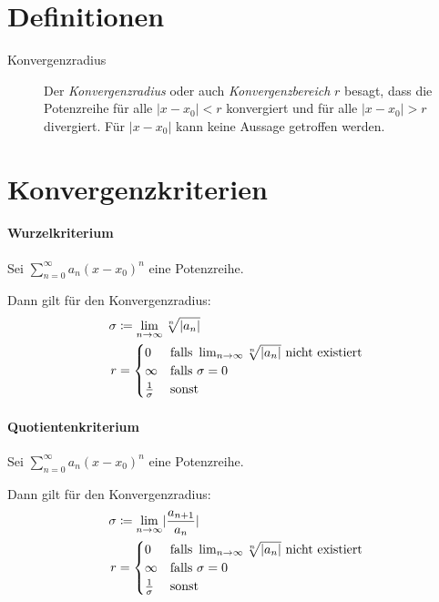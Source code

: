	\section{Definitionen}
		\begin{description}
			\item[Konvergenzradius] Der \textit{Konvergenzradius} oder auch \textit{Konvergenzbereich} $ r $ besagt, dass die Potenzreihe für alle $ \lvert x - x _ 0 \rvert < r $ konvergiert und für alle $ \lvert x - x _ 0 \rvert > r $ divergiert. Für $ \lvert x - x _ 0 \rvert $ kann keine Aussage getroffen werden.
		\end{description}

	\section{Konvergenzkriterien}
		\paragraph{Wurzelkriterium}
			Sei $ \sum _ { n = 0 } ^ \infty a _ n (x - x _ 0) ^ n $ eine Potenzreihe.

			Dann gilt für den Konvergenzradius:
			\begin{align*}
				\sigma & \coloneqq \lim_{n \to \infty} \sqrt[n]{\lvert a _ n \rvert} \\
				r      & =
				\begin{cases}
					0                & \text{falls } \lim_{n \to \infty} \sqrt[n]{\lvert a _ n \rvert} \text{ nicht existiert} \\
					\infty           & \text{falls } \sigma = 0                                                      \\
					\frac{1}{\sigma} & \text{sonst}
				\end{cases}
			\end{align*}

		\paragraph{Quotientenkriterium}
			Sei $ \sum _ { n = 0 } ^ \infty a _ n (x - x _ 0) ^ n $ eine Potenzreihe.

			Dann gilt für den Konvergenzradius:
			\begin{align*}
				\sigma & \coloneqq \lim_{n \to \infty} \lvert \frac{a _ { n + 1 }}{a _ n} \rvert \\
				r      & =
				\begin{cases}
					0                & \text{falls } \lim_{n \to \infty} \sqrt[n]{\lvert a _ n \rvert} \text{ nicht existiert} \\
					\infty           & \text{falls } \sigma = 0                                                      \\
					\frac{1}{\sigma} & \text{sonst}
				\end{cases}
			\end{align*}

